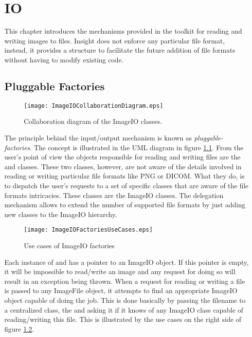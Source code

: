 

\chapter{IO}
\label{sec:IO}

This chapter introduces the mechanisms provided in the toolkit for reading and
writing images to files. Insight does not enforce any particular file format,
instead, it provides a structure to facilitate the future addition of file
formats without having to modify existing code. 



\section{Pluggable Factories}
\label{sec:ImageIOPluggableFactories}

\begin{figure}
\center
\texttt{[image: ImageIOCollaborationDiagram.eps]}
\caption{Collaboration diagram of the ImageIO classes.}
\label{fig:ImageIOCollaborationDiagram}
\end{figure}


The principle behind the input/output mechanism is known as
\emph{pluggable-factories}. The concept is illustrated in the UML diagram in
figure \ref{fig:ImageIOCollaborationDiagram}. From the user's point of view the
objects responsible for reading and writing files are the
 and  classes. These two
classes, however, are not aware of the details involved in reading or writing
particular file formats like PNG or DICOM.  What they do, is to dispatch the
user's requests to a set of specific classes that are aware of the file formats
intricacies. These classes are the ImageIO classes. The delegation mechanism
allows to extend the number of supported file formats by just adding new classes
to the ImageIO hierarchy.

\begin{figure}
\center
\texttt{[image: ImageIOFactoriesUseCases.eps]}
\caption{Use cases of ImageIO factories}
\label{fig:ImageIOFactoriesUseCases}
\end{figure}


Each instance of  and 
has a pointer to an ImageIO object. If this pointer is empty, it will be
impossible to read/write an image and any request for doing so will result in
an exception being thrown. When a request for reading or writing a file is
passed to any ImageFile object, it attempts to find an appropriate ImageIO
object capable of doing the job. This is done basically by passing the filename
to a centralized class, the  and asking it if it knows of
any ImageIO class capable of reading/writing this file. This is illustrated by
the use cases on the right side of figure \ref{fig:ImageIOFactoriesUseCases}.

